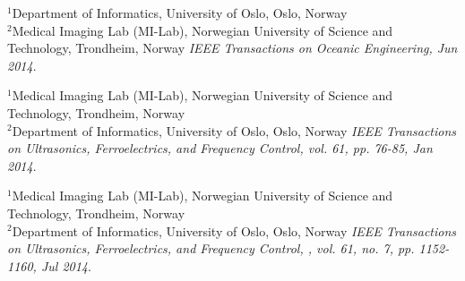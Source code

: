 \documentclass[10pt,b5paper,twoside]{book}
\begin{document}


\setcounter{chapter}{0}

\begin{bibunit}[IEEEtran]
{
	$^{1}$Department of Informatics, University of Oslo, Oslo, Norway\\
    	$^{2}$Medical Imaging Lab (MI-Lab), Norwegian University of Science and Technology, Trondheim, Norway
}
\noindent \textit{IEEE Transactions on Oceanic Engineering, Jun 2014}.
\newpage
{

}
\newpage{}
\end{bibunit}

\setcounter{chapter}{1}

\begin{bibunit}[IEEEtran]
{
	$^{1}$Medical Imaging Lab (MI-Lab), Norwegian University of Science and Technology, Trondheim, Norway\\
    	$^{2}$Department of Informatics, University of Oslo, Oslo, Norway
}
\noindent \textit{IEEE Transactions on Ultrasonics, Ferroelectrics, and Frequency Control, vol. 61, pp. 76-85, Jan 2014}.
\newpage
{}
\newpage
{}
\end{bibunit}


\begin{bibunit}[IEEEtran]
{
	$^{1}$Medical Imaging Lab (MI-Lab), Norwegian University of Science and Technology, Trondheim, Norway\\
    	$^{2}$Department of Informatics, University of Oslo, Oslo, Norway
}
\noindent \textit{IEEE Transactions on Ultrasonics, Ferroelectrics, and Frequency Control, , vol. 61, no. 7, pp. 1152-1160, Jul 2014}.
\newpage
\newpage{}
\end{bibunit}
\end{document}
